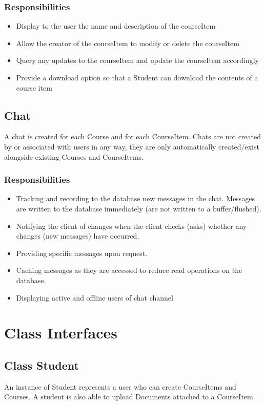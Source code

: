 \documentclass[16pt]{scrreprt}
\begin{document}
\subsection{Responsibilities}
\begin{itemize}
	\item Display to the user the name and description of the courseItem
	\item Allow the creator of the courseItem to modify or delete the courseItem
	\item Query any updates to the courseItem and update the courseItem accordingly
	\item Provide a download option so that a Student can download the contents of a course item
\end{itemize}

\section{Chat}
A chat is created for each Course and for each CourseItem. Chats are not created by or associated with users in any way, they are only automatically created/exist alongside existing Courses and CourseItems.
\subsection{Responsibilities}
\begin{itemize}
	\item Tracking and recording to the database new messages in the chat. Messages are written to the database immediately (are not written to a buffer/flushed).
	\item Notifying the client of changes when the client checks (asks) whether any changes (new messages) have occurred.
	\item Providing specific messages upon request.
	\item Caching messages as they are accessed to reduce read operations on the database.
	\item Displaying active and offline users of chat channel
\end{itemize}

\chapter{Class Interfaces}

\section{Class Student}
An instance of Student represents a user who can create CourseItems and Courses. A student is also able to upload Documents attached to a CourseItem.
\end{document}
